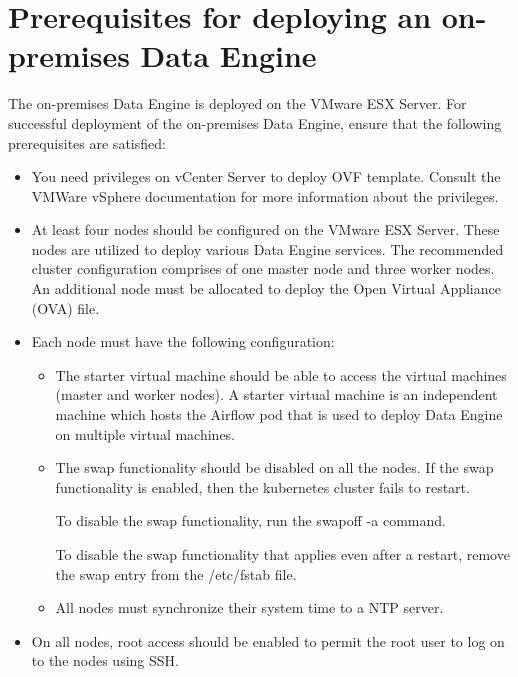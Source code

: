 \documentclass[letterpaper,10pt,english]{sphinxmanual}
\begin{document}
\chapter{Prerequisites for deploying an on-premises Data Engine}
\label{\detokenize{on_prem_dp_install_mcdmp:prerequisites-for-deploying-an-on-premises-data-engine}}
The on-premises Data Engine is deployed on the VMware ESX Server. For successful deployment of the on-premises Data Engine, ensure that the following
prerequisites are satisfied:
\begin{itemize}
\item {} 
You need privileges on vCenter Server to deploy OVF template. Consult the VMWare vSphere documentation for more information about the privileges.

\item {} 
At least four nodes should be configured on the VMware ESX Server. These nodes are utilized to deploy various Data Engine services. The recommended
cluster configuration comprises of one master node and three worker nodes. An additional node must be allocated to deploy the Open Virtual Appliance
(OVA) file.

\item {} 
Each node must have the following configuration:
\begin{itemize}
\item {} 
The starter virtual machine should be able to access the virtual machines (master and worker nodes). A starter virtual machine is an independent
machine which hosts the Airflow pod that is used to deploy Data Engine on multiple virtual machines.

\item {} 
The swap functionality should be disabled on all the nodes. If the swap functionality is enabled, then the kubernetes cluster fails to restart.

To disable the swap functionality, run the swapoff -a command.

To disable the swap functionality that applies even after a restart, remove the swap entry from the /etc/fstab file.

\item {} 
All nodes must synchronize their system time to a NTP server.

\end{itemize}

\item {} 
On all nodes, root access should be enabled to permit the root user to log on to the nodes using SSH.


\end{itemize}
\end{document}
